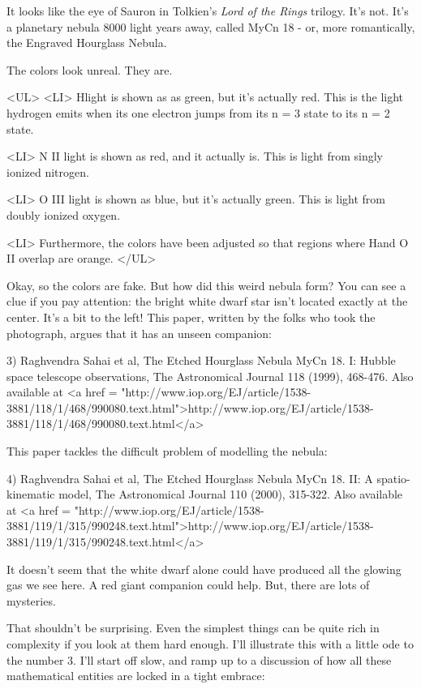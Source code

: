 It looks like the eye of Sauron in Tolkien's \emph{Lord of the Rings} 
trilogy.  It's not.  It's a planetary nebula 8000 light years away, called
MyCn 18 - or, more romantically, the Engraved Hourglass Nebula.

The colors look unreal.  They are.

<UL>
<LI>
 H\alpha  light is shown as as green, but it's actually red.  This is 
 the light hydrogen emits when its one electron jumps from its n = 3 
 state to its n = 2 state.

<LI>
 N II light is shown as red, and it actually is.  This is light 
 from singly ionized nitrogen.

<LI>
 O III light is shown as blue, but it's actually green.  This is 
 light from doubly ionized oxygen.  

<LI>
 Furthermore, the colors have been adjusted so that regions where 
 H\alpha  and O II overlap are orange.
</UL>

Okay, so the colors are fake.  But how did this weird nebula form?  
You can see a clue if you pay attention: the bright white dwarf 
star isn't located exactly at the center.  It's a bit to the left!  
This paper, written by the folks who took the photograph, argues 
that it has an unseen companion:

3) Raghvendra Sahai et al, The Etched Hourglass Nebula MyCn 18.  
I: Hubble space telescope observations, The Astronomical Journal
118 (1999), 468-476.  Also available at
<a href = "http://www.iop.org/EJ/article/1538-3881/118/1/468/990080.text.html">http://www.iop.org/EJ/article/1538-3881/118/1/468/990080.text.html</a>

This paper tackles the difficult problem of modelling the nebula:

4) Raghvendra Sahai et al, The Etched Hourglass Nebula MyCn 18.  
II: A spatio-kinematic model, The Astronomical Journal
110 (2000), 315-322.  Also available at
<a href = "http://www.iop.org/EJ/article/1538-3881/119/1/315/990248.text.html">http://www.iop.org/EJ/article/1538-3881/119/1/315/990248.text.html</a>

It doesn't seem that the white dwarf alone could have produced all
the glowing gas we see here.   A red giant companion could help.
But, there are lots of mysteries.  

That shouldn't be surprising.  Even the simplest things can be quite
rich in complexity if you look at them hard enough.  I'll illustrate 
this with a little ode to the number 3.  I'll start off slow, and 
ramp up to a discussion of how all these mathematical entities are 
locked in a tight embrace:

